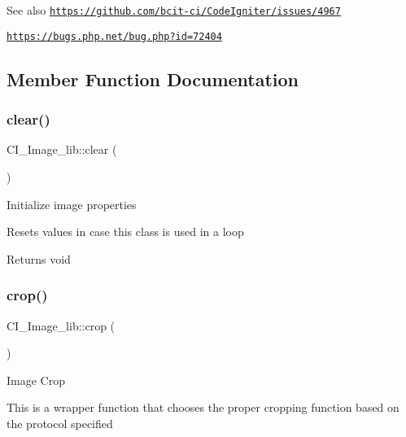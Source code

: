 \begin{DoxySeeAlso}{See also}
\href{https://github.com/bcit-ci/CodeIgniter/issues/4967}{\tt https\+://github.\+com/bcit-\/ci/\+Code\+Igniter/issues/4967} 

\href{https://bugs.php.net/bug.php?id=72404}{\tt https\+://bugs.\+php.\+net/bug.\+php?id=72404}
\end{DoxySeeAlso}


\subsection{Member Function Documentation}
\mbox{\label{class_c_i___image__lib_a27e05ad7167123c2f91b40f38e64acb0}} 
\subsubsection{\texorpdfstring{clear()}{clear()}}
{\footnotesize\ttfamily C\+I\+\_\+\+Image\+\_\+lib\+::clear (\begin{DoxyParamCaption}{ }\end{DoxyParamCaption})}

Initialize image properties

Resets values in case this class is used in a loop

\begin{DoxyReturn}{Returns}
void 
\end{DoxyReturn}
\mbox{\label{class_c_i___image__lib_a66dec1d810f0b9c2141f6141469debd9}} 
\subsubsection{\texorpdfstring{crop()}{crop()}}
{\footnotesize\ttfamily C\+I\+\_\+\+Image\+\_\+lib\+::crop (\begin{DoxyParamCaption}{ }\end{DoxyParamCaption})}

Image Crop

This is a wrapper function that chooses the proper cropping function based on the protocol specified

